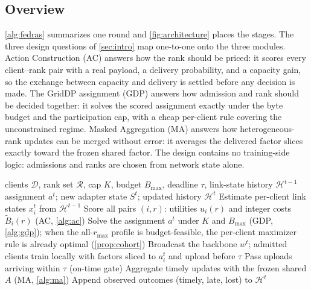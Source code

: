 \documentclass[a4paper,fleqn]{cas-dc}
\begin{document}
\subsection{Overview}
\cref{alg:fedras} summarizes one round and \cref{fig:architecture} places the stages. The three design questions of \cref{sec:intro} map one-to-one onto the three modules. Action Construction (AC) answers how the rank should be priced: it scores every client--rank pair with a real payload, a delivery probability, and a capacity gain, so the exchange between capacity and delivery is settled before any decision is made. The GridDP assignment (GDP) answers how admission and rank should be decided together: it solves the scored assignment exactly under the byte budget and the participation cap, with a cheap per-client rule covering the unconstrained regime. Masked Aggregation (MA) answers how heterogeneous-rank updates can be merged without error: it averages the delivered factor slices exactly toward the frozen shared factor. The design contains no training-side logic: admissions and ranks are chosen from network state alone.
\par
\begin{algorithm}[tbp]
\caption{FedRAS Round}
\label{alg:fedras}
\begin{algorithmic}[1]
\Require clients $\mathcal D$, rank set $\mathcal R$, cap $K$, budget $B_{\max}$, deadline $\tau$, link-state history $\mathcal H^{t-1}$
\Ensure assignment $a^t$; new adapter state $S^t$; updated history $\mathcal H^t$
\State Estimate per-client link states $x_i^t$ from $\mathcal H^{t-1}$
\State Score all pairs $(i,r)$: utilities $u_i(r)$ and integer costs $\widetilde B_i(r)$ (AC, \cref{alg:ac})
\State Solve the assignment $a^t$ under $K$ and $B_{\max}$ (GDP, \cref{alg:gdp}); when the all-$r_{\max}$ profile is budget-feasible, the per-client maximizer rule is already optimal (\cref{prop:cohort})
\State Broadcast the backbone $w^t$; admitted clients train locally with factors sliced to $a_i^t$ and upload before $\tau$
\State Pass uploads arriving within $\tau$ (on-time gate)
\State Aggregate timely updates with the frozen shared $A$ (MA, \cref{alg:ma})
\State Append observed outcomes (timely, late, lost) to $\mathcal H^t$
\end{algorithmic}
\end{algorithm}
\par
\end{document}
